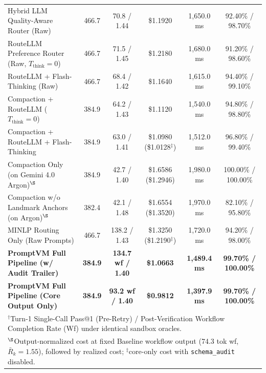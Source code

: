 \documentclass[conference,10pt]{IEEEtran}
\begin{document}
\begin{table}[b]
{\begin{tabular}{lccccc}
Hybrid LLM Quality-Aware Router (Raw) \cite{ding2024hybridllm} & 466.7 & 70.8 / 1.44 & \$1.1920 & 1,650.0 ms & 92.40\% / 98.70\% \\
RouteLLM Preference Router (Raw, $T_{\text{think}}=0$) \cite{ong2025routellm} & 466.7 & 71.5 / 1.45 & \$1.2180 & 1,680.0 ms & 91.20\% / 98.60\% \\
RouteLLM + Flash-Thinking (Raw) \cite{ong2025routellm} & 466.7 & 68.4 / 1.42 & \$1.1640 & 1,615.0 ms & 94.40\% / 99.10\% \\
Compaction + RouteLLM ($T_{\text{think}}=0$) \cite{ong2025routellm} & 384.9 & 64.2 / 1.43 & \$1.1120 & 1,540.0 ms & 94.80\% / 98.80\% \\
Compaction + RouteLLM + Flash-Thinking \cite{ong2025routellm} & 384.9 & 63.0 / 1.41 & \$1.0980 (\$1.0128$^\ddagger$) & 1,512.0 ms & 96.80\% / 99.40\% \\
Compaction Only (on Gemini 4.0 Argon)$^\S$ & 384.9 & 42.7 / 1.40 & \$1.6586 (\$1.2946) & 1,980.0 ms & 100.00\% / 100.00\% \\
Compaction w/o Landmark Anchors (on Argon)$^\S$ & 382.4 & 42.1 / 1.48 & \$1.6554 (\$1.3520) & 1,970.0 ms & 82.10\% / 95.80\% \\
MINLP Routing Only (Raw Prompts) & 466.7 & 138.2 / 1.43 & \$1.3250 (\$1.2190$^\ddagger$) & 1,720.0 ms & 94.20\% / 98.00\% \\
\textbf{PromptVM Full Pipeline (w/ Audit Trailer)} & \textbf{384.9} & \textbf{134.7 wf / 1.40} & \textbf{\$1.0663} & \textbf{1,489.4 ms} & \textbf{99.70\% / 100.00\%} \\
\textbf{PromptVM Full Pipeline (Core Output Only)} & \textbf{384.9} & \textbf{93.2 wf / 1.40} & \textbf{\$0.9812} & \textbf{1,397.9 ms} & \textbf{99.70\% / 100.00\%} \\
\bottomrule
\multicolumn{6}{l}{\scriptsize $^\dagger$Turn-1 Single-Call Pass@1 (Pre-Retry) / Post-Verification Workflow Completion Rate (Wf) under identical sandbox oracles.} \\
\multicolumn{6}{l}{\scriptsize $^\S$Output-normalized cost at fixed Baseline workflow output (74.3 tok wf, $\bar{R}_k=1.55$), followed by realized cost; $^\ddagger$core-only cost with \texttt{schema\_audit} disabled.}
\end{tabular}%
}
\end{table}
\end{document}
